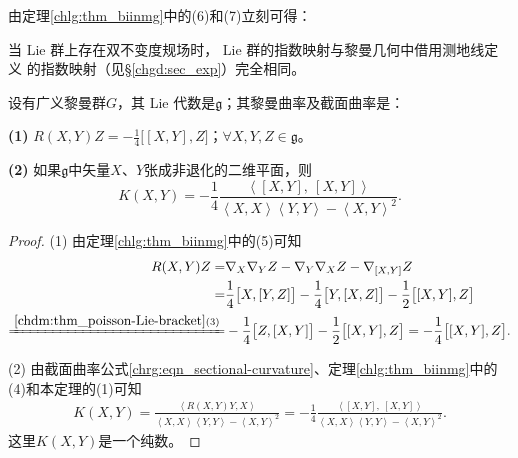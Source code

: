 由定理\ref{chlg:thm_biinmg}中的(6)和(7)立刻可得：
\begin{corollary}\label{chlg:thm_expiso}
    当 Lie 群上存在双不变度规场时， Lie 群的指数映射与黎曼几何中借用测地线定义
    的指数映射（见\S\ref{chgd:sec_exp}）完全相同。
\end{corollary}

\begin{theorem}\label{chlg:thm_riemann-section-curvature}
    设有广义黎曼群$G$，其 Lie 代数是$\mathfrak{g}$；其黎曼曲率及截面曲率是：
    
    {\bfseries (1)} $R(X,Y)Z=-\frac{1}{4}\bigl[[X,Y],Z\bigr]$；$ \forall X,Y,Z\in \mathfrak{g}$。
    
    {\bfseries (2)} 如果$\mathfrak{g}$中矢量$X$、$Y$张成非退化的二维平面，则
    \begin{equation}
        K(X,Y)=-\frac{1}{4} \frac{\left<[X,Y],\  [X,Y]\right>}
        {\left<X,X\right>\left<Y,Y\right>-\left<X,Y\right>^2} .
    \end{equation}
\end{theorem}
\begin{proof}
    (1) 由定理\ref{chlg:thm_biinmg}中的(5)可知
    \begin{align*}
        R(X,Y)Z =& \nabla_X \nabla_Y Z - \nabla_Y \nabla_X Z - \nabla_{[X,Y]} Z \\
        =&  \frac{1}{4} \bigl[X, [Y,Z]\bigr] - \frac{1}{4} \bigl[Y, [X,Z]\bigr]
        -\frac{1}{2} \bigl[[X,Y],Z\bigr] \\
        \xlongequal{\ref{chdm:thm_poisson-Lie-bracket}(3)}&
        -\frac{1}{4} \bigl[Z, [X,Y]\bigr] -\frac{1}{2} \bigl[[X,Y],Z\bigr] 
        =  -\frac{1}{4} \bigl[[X,Y],Z\bigr] .
    \end{align*}
    
    (2) 由截面曲率公式\eqref{chrg:eqn_sectional-curvature}、定理\ref{chlg:thm_biinmg}中的(4)和本定理的(1)可知
    \begin{align*}
        K(X,Y) %
        = \frac{\left<R(X,Y)Y,X\right> } {\left<X,X\right>\left<Y,Y\right>-\left<X,Y\right>^2} 
        = -\frac{1}{4} \frac{\left<[X,Y],\  [X,Y]\right>}
        {\left<X,X\right>\left<Y,Y\right>-\left<X,Y\right>^2} .
    \end{align*}
    这里$K (X, Y)$是一个纯数。
\end{proof}











